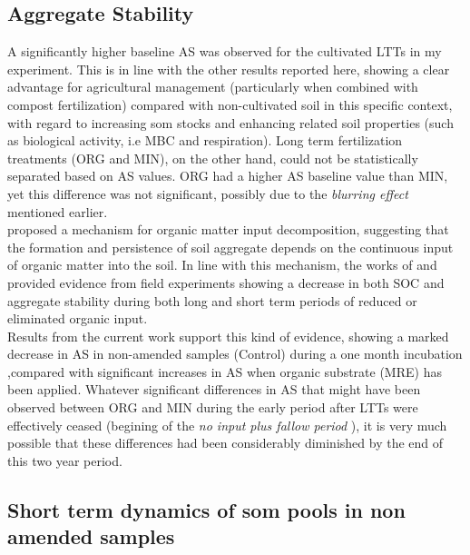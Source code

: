 	\subsection{Aggregate Stability}
	A significantly higher baseline AS was observed for the cultivated LTTs in my experiment. This is in line with the other results reported here, showing a clear advantage for agricultural management (particularly when combined with compost fertilization) compared with non-cultivated soil in this specific context, with regard to increasing \gls{som} stocks and enhancing related soil properties (such as biological activity, i.e MBC and respiration). Long term fertilization treatments (ORG and MIN), on the other hand, could not be statistically separated based on AS values. ORG had a higher AS baseline value than MIN, yet this difference was not significant, possibly due to the \textit{blurring effect} mentioned earlier. \\
	\citep{golchin1994} proposed a mechanism for organic matter input decomposition, suggesting that the formation and persistence of soil aggregate depends on the continuous input of organic matter into the soil. In line with this mechanism, the works of \citep{li2007} and \citep{redmile-gordon2020} provided evidence from field experiments showing a decrease in both SOC and aggregate stability during both long and short term periods of reduced or eliminated organic input.\\
	Results from the current work support this kind of evidence, showing  a marked decrease in AS in non-amended samples (Control) during a one month incubation ,compared with significant increases in AS when organic substrate (MRE) has been applied.
	Whatever significant differences in AS that might have been observed between ORG and MIN during the early period after LTTs were  effectively ceased (begining of the \textit{no input plus fallow period} ), it is very much possible that these differences had been considerably diminished by the end of this two year period.\\

	\subsection{Short term dynamics of \gls{som} pools in non amended samples}\hypertarget{subsection_4.2.2}{}

